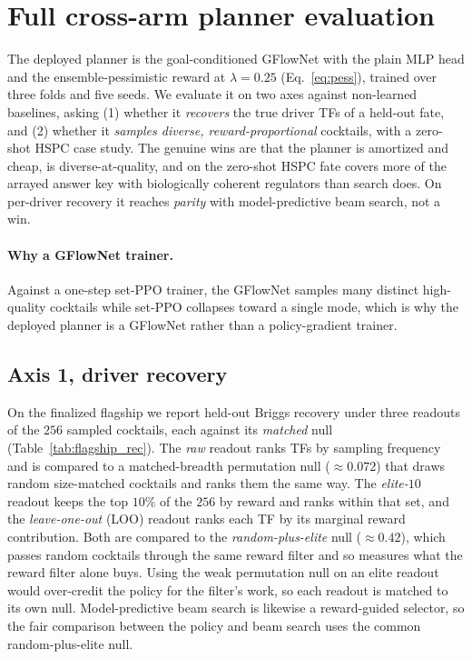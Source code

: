 \section{Full cross-arm planner evaluation}\label{app:rl}
The deployed planner is the goal-conditioned GFlowNet with the plain MLP head and the
ensemble-pessimistic reward at $\lambda{=}0.25$ (Eq.~\eqref{eq:pess}), trained over three
folds and five seeds. We evaluate it on two axes against non-learned baselines, asking (1) whether it
\emph{recovers} the true driver TFs of a held-out fate, and (2) whether it \emph{samples
diverse, reward-proportional} cocktails, with a zero-shot HSPC case study. The genuine wins
are that the planner is amortized and cheap, is diverse-at-quality, and on the zero-shot HSPC fate
covers more of the arrayed answer key with biologically coherent regulators than search does. On
per-driver recovery it reaches \emph{parity} with model-predictive beam search, not a win.

\paragraph{Why a GFlowNet trainer.} Against a one-step set-PPO trainer, the GFlowNet samples
many distinct high-quality cocktails while set-PPO collapses toward a single mode, which is
why the deployed planner is a GFlowNet rather than a policy-gradient trainer.

\subsection{Axis 1, driver recovery}
On the finalized flagship we report held-out Briggs recovery under three readouts of the
$256$ sampled cocktails, each against its \emph{matched} null (Table~\ref{tab:flagship_rec}).
The \emph{raw} readout ranks TFs by sampling frequency and is compared to a matched-breadth
permutation null ($\approx0.072$) that draws random size-matched cocktails and ranks them the
same way. The \emph{elite-$10$} readout keeps the top $10\%$ of the $256$ by reward and ranks
within that set, and the \emph{leave-one-out} (LOO) readout ranks each TF by its marginal
reward contribution. Both are compared to the \emph{random-plus-elite} null ($\approx0.42$),
which passes random cocktails through the same reward filter and so measures what the reward
filter alone buys. Using the weak permutation null on an elite readout would over-credit the
policy for the filter's work, so each readout is matched to its own null. Model-predictive
beam search is likewise a reward-guided selector, so the fair comparison between the policy
and beam search uses the common random-plus-elite null.

